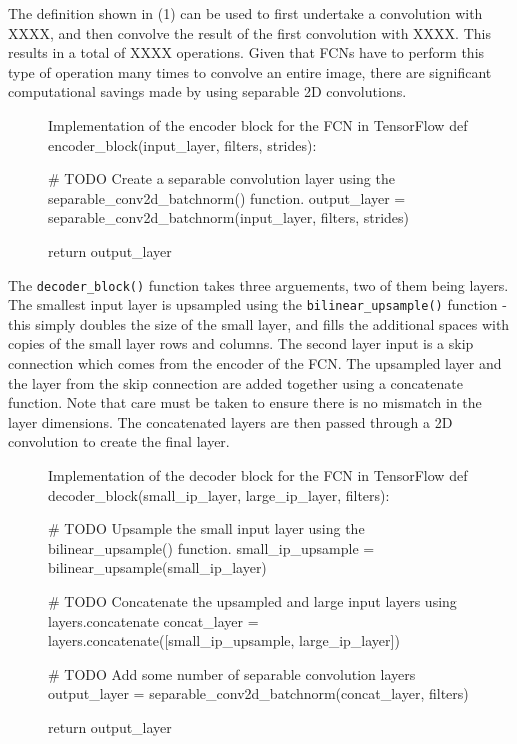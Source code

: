 \documentclass[a4paper]{article}
\begin{document}
The definition shown in (1) can be used to first undertake a convolution with XXXX, and then convolve the result of the first convolution with XXXX. This results in a total of XXXX operations. Given that FCNs have to perform this type of operation many times to convolve an entire image, there are significant computational savings made by using separable 2D convolutions.
   
\begin{figure}[h]\scriptsize
\begin{sexylisting}{Implementation of the encoder block for the FCN in TensorFlow}
def encoder_block(input_layer, filters, strides):
    
    # TODO Create a separable convolution layer using the separable_conv2d_batchnorm() function.
    output_layer = separable_conv2d_batchnorm(input_layer, filters, strides)
    
    return output_layer
\end{sexylisting}
\end{figure}

The \verb|decoder_block()| function takes three arguements, two of them being layers. The smallest input layer is upsampled using the \verb|bilinear_upsample()| function - this simply doubles the size of the small layer, and fills the additional spaces with copies of the small layer rows and columns. The second layer input is a skip connection which comes from the encoder of the FCN. The upsampled layer and the layer from the skip connection are added together using a concatenate function. Note that care must be taken to ensure there is no mismatch in the layer dimensions. The concatenated layers are then passed through a 2D convolution to create the final layer.  

\begin{figure}[h]\scriptsize
\begin{sexylisting}{Implementation of the decoder block for the FCN in TensorFlow}
def decoder_block(small_ip_layer, large_ip_layer, filters):
    
    # TODO Upsample the small input layer using the bilinear_upsample() function.
    small_ip_upsample = bilinear_upsample(small_ip_layer)
    
    # TODO Concatenate the upsampled and large input layers using layers.concatenate
    concat_layer = layers.concatenate([small_ip_upsample, large_ip_layer])
    
    # TODO Add some number of separable convolution layers
    output_layer = separable_conv2d_batchnorm(concat_layer, filters)
    
    return output_layer
\end{sexylisting}
\end{figure}
\end{document}
